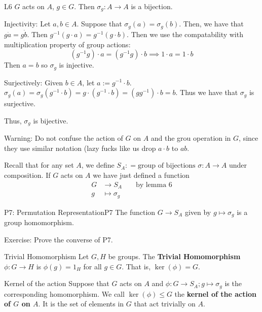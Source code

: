 \documentclass{article}
\begin{document}
\begin{clem}{L6}{}
    $G$ acts on $A$, $g \in G$. Then $\sigma_g: A\to A$ is a bijection.

    \begin{cpf}
        Injectivity: Let $a,b \in A$. Suppose that $\sigma_g(a) = \sigma_g(b)$. Then, we have that $g \dot a = g \dot b$. Then $g^{-1}(g\cdot a) = g^{-1}(g \cdot b)$. Then we use the compatability with multiplication property of group actions:
        \[
            (g^{-1}g) \cdot a = \left( g^{-1}g \right) \cdot b \implies 1 \cdot a = 1 \cdot b
        \]
        Then $a = b$ so $\sigma_g$ is injective.

        Surjectively: Given $b \in A$, let $a := g^{-1}\cdot b$. $\sigma_g(a) = \sigma_g(g^{-1} \cdot b) = g \cdot (g^{-1}\cdot b) = (gg^{-1})\cdot b = b$. Thus we have that $\sigma_g$ is surjective.

        Thus, $\sigma_g$ is bijective.
    \end{cpf}
\end{clem}

Warning: Do not confuse the action of $G$ on $A$ and the grou operation in $G$, since they use similar notation (lazy fucks like us drop $a\cdot b$ to $ab$. 

Recall that for any set $A$, we define $S_A : = \text{group of bijections}$ $\sigma: A \to A$ under composition. If $G$ acts on $A$ we have just defined a function
\begin{align*}
    G & \to S_A && \text{ by lemma 6}\\
    g & \mapsto \sigma_g
\end{align*}

\begin{cprop}{P7: Permutation Representation}{P7}
    The function $G \to S_A$ given by $g \mapsto \sigma_g$ is a group homomorphism.
\end{cprop}

Exercise: Prove the converse of P7. 

\begin{cdef}{Trivial Homomorphism}{}
    Let $G,H$ be groups. The \textbf{Trivial Homomorphism} $\phi: G \to H$ is $\phi(g) = 1_H$ for all $g \in G$. That is, $\ker(\phi) = G$. 
\end{cdef}

\begin{cdef}{Kernel of the action}{}
    Suppose that $G$ acts on $A$ and $\phi : G \to S_A; g \mapsto \sigma_g$ is the corresponding homomorphism. We call $\ker(\phi) \leq G$ the \textbf{kernel of the action of $G$ on $A$}. It is the set of elements in $G$ that act trivially on $A$. 
\end{cdef}
\end{document}
